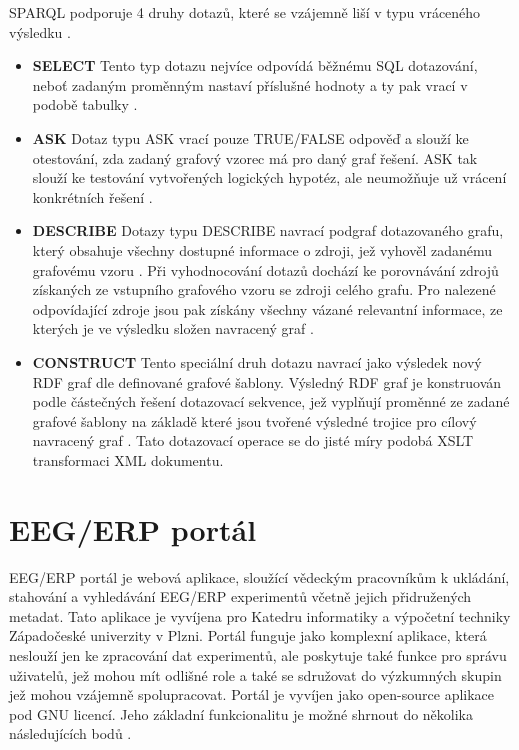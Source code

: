 \documentclass{projekt}
\begin{document}
SPARQL podporuje 4 druhy dotazů, které se vzájemně liší v typu vráceného výsledku \cite{_13}.

\begin {itemize}

\item \textbf{SELECT} Tento typ dotazu nejvíce odpovídá běžnému SQL dotazování, neboť zadaným proměnným nastaví příslušné hodnoty a ty pak vrací v podobě tabulky \cite{_14}.
\item \textbf{ASK} Dotaz typu ASK vrací pouze TRUE/FALSE odpověď a slouží ke otestování, zda zadaný grafový vzorec má pro daný graf řešení. ASK tak slouží ke testování vytvořených logických hypotéz, ale neumožňuje už vrácení konkrétních řešení \cite{_13}.
\item \textbf{DESCRIBE} Dotazy typu DESCRIBE navrací podgraf dotazovaného grafu, který obsahuje všechny dostupné informace o zdroji, jež vyhověl zadanému grafovému vzoru \cite{_13}. Při vyhodnocování dotazů dochází ke porovnávání zdrojů získaných ze vstupního grafového vzoru se zdroji celého grafu. Pro nalezené odpovídající zdroje jsou pak získány všechny vázané relevantní informace, ze kterých je ve výsledku složen navracený graf \cite{_14}.
\item \textbf{CONSTRUCT} Tento speciální druh dotazu navrací jako výsledek nový RDF graf dle definované grafové šablony. Výsledný RDF graf je konstruován podle částečných řešení dotazovací sekvence, jež vyplňují proměnné ze zadané grafové šablony na základě které jsou tvořené výsledné trojice pro cílový navracený graf \cite{_13}. Tato dotazovací operace se do jisté míry podobá XSLT transformaci XML dokumentu.

\end {itemize}

\chapter{EEG/ERP portál}
\hspace{0.65cm}EEG/ERP portál je webová aplikace, sloužící vědeckým pracovníkům k ukládání, stahování a vyhledávání EEG/ERP experimentů včetně jejich přidružených metadat. Tato aplikace je vyvíjena pro Katedru informatiky a výpočetní techniky Západočeské univerzity v Plzni. Portál funguje jako komplexní aplikace, která neslouží jen ke zpracování dat experimentů, ale poskytuje také funkce pro správu uživatelů, jež mohou mít odlišné role a také se sdružovat do výzkumných skupin jež mohou vzájemně spolupracovat. Portál je vyvíjen jako open-source aplikace pod GNU licencí. Jeho základní funkcionalitu je možné shrnout do několika následujících bodů \cite{_15}.
\end{document}
